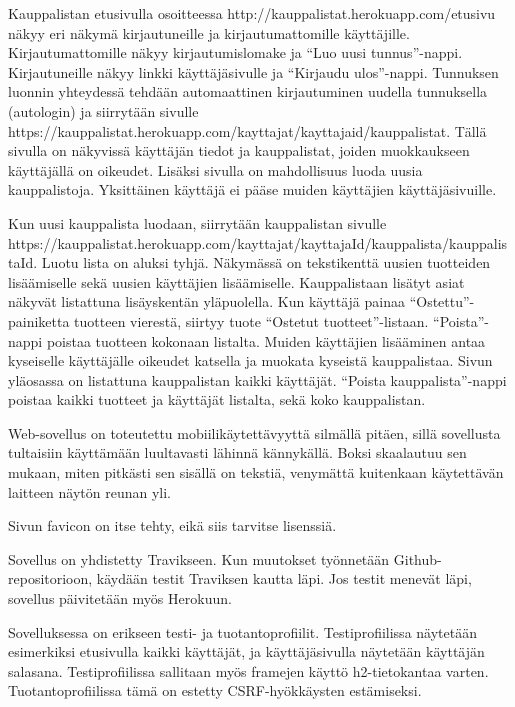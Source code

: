\documentclass[12pt,a4paper]{article}
\newcommand{\quotes}[1]{``#1''}
\begin{document}
Kauppalistan etusivulla osoitteessa http://kauppalistat.herokuapp.com/etusivu näkyy eri näkymä kirjautuneille ja kirjautumattomille käyttäjille. Kirjautumattomille näkyy kirjautumislomake ja \quotes{Luo uusi tunnus}-nappi. Kirjautuneille näkyy linkki käyttäjäsivulle ja \quotes{Kirjaudu ulos}-nappi. Tunnuksen luonnin yhteydessä tehdään automaattinen kirjautuminen uudella tunnuksella (autologin) ja siirrytään sivulle https://kauppalistat.herokuapp.com/kayttajat/{kayttajaid}/kauppalistat. Tällä sivulla on näkyvissä käyttäjän tiedot ja kauppalistat, joiden muokkaukseen käyttäjällä on oikeudet. Lisäksi sivulla on mahdollisuus luoda uusia kauppalistoja. Yksittäinen käyttäjä ei pääse muiden käyttäjien käyttäjäsivuille.

Kun uusi kauppalista luodaan, siirrytään kauppalistan sivulle \linebreak https://kauppalistat.herokuapp.com/kayttajat/{kayttajaId}/kauppalista/{kauppalistaId}. Luotu lista on aluksi tyhjä. Näkymässä on tekstikenttä uusien tuotteiden lisäämiselle sekä uusien käyttäjien lisäämiselle.  Kauppalistaan lisätyt asiat näkyvät listattuna lisäyskentän yläpuolella. Kun käyttäjä painaa \quotes{Ostettu}-painiketta tuotteen vierestä, siirtyy tuote \quotes{Ostetut tuotteet}-listaan. \quotes{Poista}-nappi poistaa tuotteen kokonaan listalta. Muiden käyttäjien lisääminen antaa kyseiselle käyttäjälle oikeudet katsella ja muokata kyseistä kauppalistaa. Sivun yläosassa on listattuna kauppalistan kaikki käyttäjät. \quotes{Poista kauppalista}-nappi poistaa kaikki tuotteet ja käyttäjät listalta, sekä koko kauppalistan.

Web-sovellus on toteutettu mobiilikäytettävyyttä silmällä pitäen, sillä sovellusta tultaisiin käyttämään luultavasti lähinnä kännykällä. Boksi skaalautuu sen mukaan, miten pitkästi sen sisällä on tekstiä, venymättä kuitenkaan käytettävän laitteen näytön reunan yli.

Sivun favicon on itse tehty, eikä siis tarvitse lisenssiä.

Sovellus on yhdistetty Travikseen. Kun muutokset työnnetään Github-repositorioon, käydään testit Traviksen kautta läpi. Jos testit menevät läpi, sovellus päivitetään myös Herokuun.

Sovelluksessa on erikseen testi- ja tuotantoprofiilit. Testiprofiilissa näytetään esimerkiksi etusivulla kaikki käyttäjät, ja käyttäjäsivulla näytetään käyttäjän salasana. Testiprofiilissa sallitaan myös framejen käyttö h2-tietokantaa varten. Tuotantoprofiilissa tämä on estetty CSRF-hyökkäysten estämiseksi.
\end{document}
